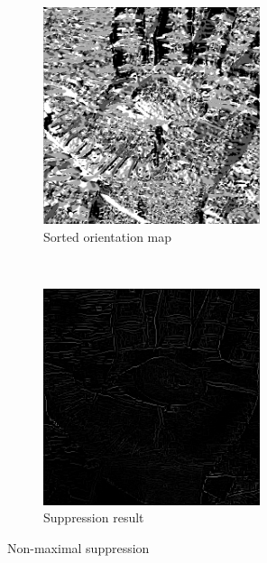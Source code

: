 \documentclass[12pt]{article}
\begin{document}
\begin{figure}[H]
    \centering
    \begin{subfigure}[t]{0.5\textwidth}
        \centering
        \includegraphics[height=2.5in]{images/canny_ori}
        \caption{Sorted orientation map}
        \label{fig:canny_ori}
    \end{subfigure}%
    ~
    \begin{subfigure}[t]{0.5\textwidth}
        \centering
        \includegraphics[height=2.5in]{images/canny_3}
        \caption{Suppression result}
    \end{subfigure}
    \caption{Non-maximal suppression}
\end{figure}
\end{document}
